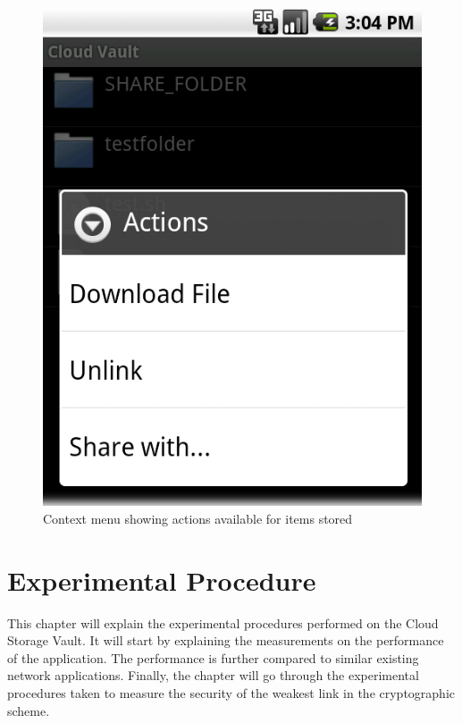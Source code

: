 \documentclass[pdftex,english,10pt,b5paper,twoside]{book}
\begin{document}
\begin{figure}[h!]
    \centering
    \includegraphics[scale=0.4]{client-browsecontext.png}
    \caption{Context menu showing actions available for items stored}
    \label{fig:CSVAndroid:remotecontext}
\end{figure}

\chapter{Experimental Procedure}
\label{ch:experimental}

This chapter will explain the experimental procedures performed on the Cloud
Storage Vault. It will start by explaining the measurements on the performance
of the application. The performance is further compared to similar existing
network applications. Finally, the chapter will go through the experimental
procedures taken to measure the security of the weakest link in the cryptographic
scheme.
\end{document}
